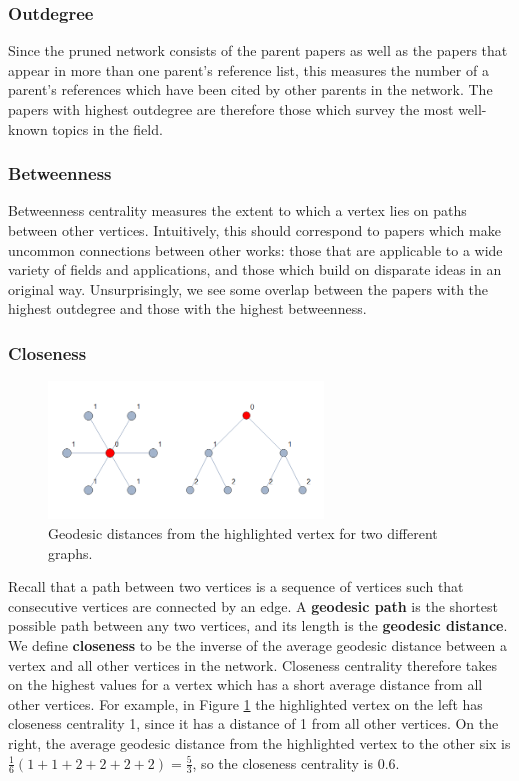 \documentclass[12pt]{thesis}
\theoremstyle{plain}
\theoremstyle{definition}
\theoremstyle{remark}
\begin{document}
\subsubsection{Outdegree} Since the pruned network consists of the parent papers as well as the papers that appear in more than one parent's reference list, this measures the number of a parent's references which have been cited by other parents in the network. The papers with highest outdegree are therefore those which survey the most well-known topics in the field.

\subsubsection{Betweenness} Betweenness centrality measures the extent to which a vertex lies on paths between other vertices. Intuitively, this should correspond to papers which make uncommon connections between other works: those that are applicable to a wide variety of fields and applications, and those which build on disparate ideas in an original way. Unsurprisingly, we see some overlap between the papers with the highest outdegree and those with the highest betweenness.

\subsubsection{Closeness} 

\begin{figure}[b!]
\centering
\includegraphics[width=0.65\textwidth]{closeness_demo.png}
\vspace{-10pt}
\caption{Geodesic distances from the highlighted vertex for two different graphs.}
\label{fig:closeness_demo}
\end{figure}

Recall that a path between two vertices is a sequence of vertices such that consecutive vertices are connected by an edge. A \textbf{geodesic path} is the shortest possible path between any two vertices, and its length is the \textbf{geodesic distance}. We define \textbf{closeness} to be the inverse of the average geodesic distance between a vertex and all other vertices in the network. Closeness centrality therefore takes on the highest values for a vertex which has a short average distance from all other vertices. For example, in Figure \ref{fig:closeness_demo} the highlighted vertex on the left has closeness centrality 1, since it has a distance of 1 from all other vertices. On the right, the average geodesic distance from the highlighted vertex to the other six is $\frac{1}{6}(1+1+2+2+2+2)=\frac{5}{3}$, so the closeness centrality is 0.6.
\end{document}
